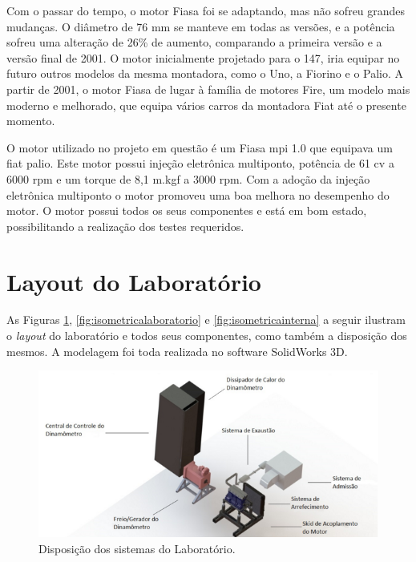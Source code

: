 	Com o passar do tempo, o motor Fiasa foi se adaptando, mas não sofreu grandes mudanças. O diâmetro de 76 mm se manteve em todas as versões, e a potência sofreu uma alteração de 26\% de aumento, comparando a primeira versão e a versão final de 2001. O motor inicialmente projetado para o 147, iria equipar no futuro outros modelos da mesma montadora, como o Uno, a Fiorino e o Palio. A partir de 2001, o motor Fiasa de lugar à família de motores Fire, um modelo mais moderno e melhorado, que equipa vários carros da montadora Fiat até o presente momento.
	
	O motor utilizado no projeto em questão é um Fiasa mpi 1.0 que equipava um fiat palio. Este motor possui injeção eletrônica multiponto, potência de 61 cv a 6000 rpm e um torque de 8,1 m.kgf a 3000 rpm. Com a adoção da injeção eletrônica multiponto o motor promoveu uma boa melhora no desempenho do motor. O motor possui todos os seus componentes e está em bom estado, possibilitando a realização dos testes requeridos.
	
\section{Layout do Laboratório}

	As Figuras \ref{fig:sistemaslaboratorio}, \ref{fig:isometricalaboratorio} e \ref{fig:isometricainterna} a seguir ilustram o \textit{layout} do laboratório e todos seus componentes, como também a disposição dos mesmos. A modelagem foi toda realizada no software SolidWorks 3D.
	
\begin{figure}[h!]
	\centering
	\includegraphics[keepaspectratio=true,scale= 0.4]{figuras/sistemaslaboratorio.png}
	\caption{Disposição dos sistemas do Laboratório.}
	\label{fig:sistemaslaboratorio}
\end{figure}
	
